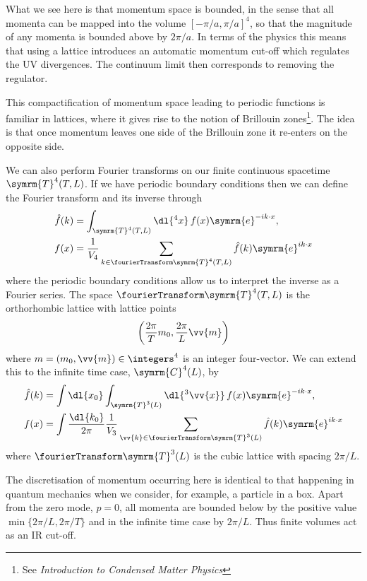 \documentclass[fleqn]{NotesClass}
\newcommand*{\course}[1]{\textit{#1}}
\newcommand{\e}{\symrm{e}}
\begin{document}
    What we see here is that momentum space is bounded, in the sense that all momenta can be mapped into the volume \([-\pi/a, \pi/a]^4\), so that the magnitude of any momenta is bounded above by \(2\pi/a\).
    In terms of the physics this means that using a lattice introduces an automatic momentum cut-off which regulates the UV divergences.
    The continuum limit then corresponds to removing the regulator.
    
    This compactification of momentum space leading to periodic functions is familiar in lattices, where it gives rise to the notion of Brillouin zones\footnote{See \course{Introduction to Condensed Matter Physics}}.
    The idea is that once momentum leaves one side of the Brillouin zone it re-enters on the opposite side.
    
    We can also perform Fourier transforms on our finite continuous spacetime \(\symrm{T}^4(T, L)\).
    If we have periodic boundary conditions then we can define the Fourier transform and its inverse through
    \begin{align}
        \hat{f}(k) &= \int_{\symrm{T}^4(T, L)} \dl{^4x} \, f(x)\e^{-ik\cdot x},\\
        f(x) &= \frac{1}{V_4} \sum_{k \in \fourierTransform\symrm{T}^4(T, L)} \hat{f}(k)\e^{ik\cdot x}
    \end{align}
    where the periodic boundary conditions allow us to interpret the inverse as a Fourier series.
    The space \(\fourierTransform\symrm{T}^4(T, L)\) is the orthorhombic lattice with lattice points
    \begin{equation}
        \left( \frac{2\pi}{T}m_0, \frac{2\pi}{L}\vv{m} \right)
    \end{equation}
    where \(m = (m_0, \vv{m}) \in \integers^4\) is an integer four-vector.
    We can extend this to the infinite time case, \(\symrm{C}^4(L)\), by
    \begin{align}
        \hat{f}(k) &= \int \dl{x_0} \int_{\symrm{T}^3(L)} \dl{^3\vv{x}} \, f(x) \e^{-ik\cdot x},\\
        f(x) &= \int \frac{\dl{k_0}}{2\pi} \frac{1}{V_3} \sum_{\vv{k} \in \fourierTransform\symrm{T}^3(L)} \hat{f}(k)\e^{ik\cdot x}
    \end{align}
    where \(\fourierTransform\symrm{T}^3(L)\) is the cubic lattice with spacing \(2\pi/L\).
    
    The discretisation of momentum occurring here is identical to that happening in quantum mechanics when we consider, for example, a particle in a box.
    Apart from the zero mode, \(p = 0\), all momenta are bounded below by the positive value \(\min\{2\pi/L, 2\pi/T\}\) and in the infinite time case by \(2\pi/L\).
    Thus finite volumes act as an IR cut-off.
    
\end{document}
